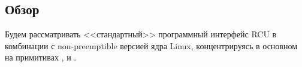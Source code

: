 \subsection{Обзор}
%
%
%
Будем рассматривать <<стандартный>> программный интерфейс RCU
в комбинации с non-preemptible версией ядра Linux,
концентрируясь в основном на примитивах
,  и .
%
